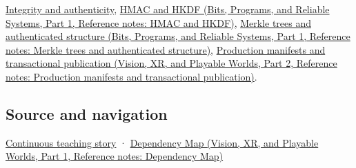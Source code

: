 \hypertarget{appendix-ed338677de0a-used-by}{}

\hyperref[appendix-cbe594d1ab0a]{Integrity and authenticity}, \href{../01-Bits-Programs-and-Reliable-Systems-P01/main.pdf\#nameddest=appendix-50af792c9da7}{HMAC and HKDF (Bits, Programs, and Reliable Systems, Part 1, Reference notes: HMAC and HKDF)}, \href{../01-Bits-Programs-and-Reliable-Systems-P01/main.pdf\#nameddest=appendix-098192f8d46d}{Merkle trees and authenticated structure (Bits, Programs, and Reliable Systems, Part 1, Reference notes: Merkle trees and authenticated structure)}, \href{../07-Vision-XR-and-Playable-Worlds-P02/main.pdf\#nameddest=appendix-91eaa3cbdbc3}{Production manifests and transactional publication (Vision, XR, and Playable Worlds, Part 2, Reference notes: Production manifests and transactional publication)}.

\subsection{Source and navigation}\label{appendix-ed338677de0a-source-and-navigation}

\hypertarget{appendix-ed338677de0a-source-and-navigation}{}

\hyperref[01-foundations-i-ch002-bytes-become-a-durable-agreement]{Continuous teaching story} · \href{../07-Vision-XR-and-Playable-Worlds-P01/main.pdf\#nameddest=appendix-4ad47bdd269a}{Dependency Map (Vision, XR, and Playable Worlds, Part 1, Reference notes: Dependency Map)}
